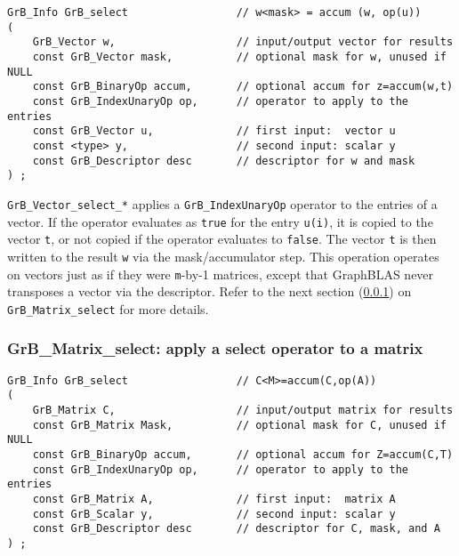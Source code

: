 \documentclass[12pt]{article}
\begin{document}
\begin{mdframed}[userdefinedwidth=6in]
{\footnotesize
\begin{verbatim}
GrB_Info GrB_select                 // w<mask> = accum (w, op(u))
(
    GrB_Vector w,                   // input/output vector for results
    const GrB_Vector mask,          // optional mask for w, unused if NULL
    const GrB_BinaryOp accum,       // optional accum for z=accum(w,t)
    const GrB_IndexUnaryOp op,      // operator to apply to the entries
    const GrB_Vector u,             // first input:  vector u
    const <type> y,                 // second input: scalar y
    const GrB_Descriptor desc       // descriptor for w and mask
) ;
\end{verbatim} } \end{mdframed}

\verb'GrB_Vector_select_*' applies a \verb'GrB_IndexUnaryOp' operator to the
entries of a vector.  If the operator evaluates as \verb'true' for the entry
\verb'u(i)', it is copied to the vector \verb't', or not copied if the operator
evaluates to \verb'false'.   The vector \verb't' is then written to the result
\verb'w' via the mask/accumulator step.  This operation operates on vectors
just as if they were \verb'm'-by-1 matrices, except that GraphBLAS never
transposes a vector via the descriptor.  Refer to the next section
(\ref{select_matrix}) on \verb'GrB_Matrix_select' for more details.

\newpage
\subsubsection{{\sf GrB\_Matrix\_select:} apply a select operator to a matrix}
\label{select_matrix}

\begin{mdframed}[userdefinedwidth=6in]
{\footnotesize
\begin{verbatim}
GrB_Info GrB_select                 // C<M>=accum(C,op(A))
(
    GrB_Matrix C,                   // input/output matrix for results
    const GrB_Matrix Mask,          // optional mask for C, unused if NULL
    const GrB_BinaryOp accum,       // optional accum for Z=accum(C,T)
    const GrB_IndexUnaryOp op,      // operator to apply to the entries
    const GrB_Matrix A,             // first input:  matrix A
    const GrB_Scalar y,             // second input: scalar y
    const GrB_Descriptor desc       // descriptor for C, mask, and A
) ;
\end{verbatim} } \end{mdframed}
\end{document}
